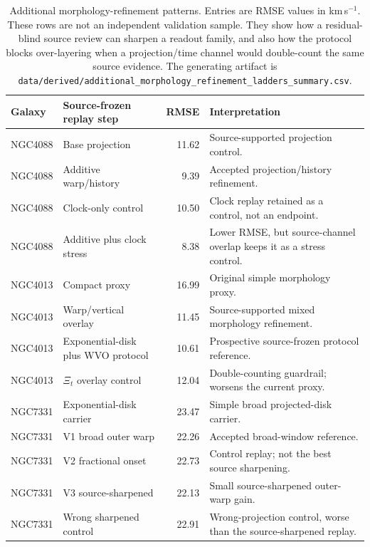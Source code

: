\documentclass[11pt]{article}
\begin{document}
\begin{table}[H]
\centering
\small
\begin{tabularx}{\linewidth}{@{}llrX@{}}
\toprule
Galaxy & Source-frozen replay step & RMSE & Interpretation \\
\midrule
NGC4088 & Base projection & 11.62 &
Source-supported projection control. \\
NGC4088 & Additive warp/history & 9.39 &
Accepted projection/history refinement. \\
NGC4088 & Clock-only control & 10.50 &
Clock replay retained as a control, not an endpoint. \\
NGC4088 & Additive plus clock stress & 8.38 &
Lower RMSE, but source-channel overlap keeps it as a stress control. \\
\midrule
NGC4013 & Compact proxy & 16.99 &
Original simple morphology proxy. \\
NGC4013 & Warp/vertical overlay & 11.45 &
Source-supported mixed morphology refinement. \\
NGC4013 & Exponential-disk plus WVO protocol & 10.61 &
Prospective source-frozen protocol reference. \\
NGC4013 & \(\Xi_t\) overlay control & 12.04 &
Double-counting guardrail; worsens the current proxy. \\
\midrule
NGC7331 & Exponential-disk carrier & 23.47 &
Simple broad projected-disk carrier. \\
NGC7331 & V1 broad outer warp & 22.26 &
Accepted broad-window reference. \\
NGC7331 & V2 fractional onset & 22.73 &
Control replay; not the best source sharpening. \\
NGC7331 & V3 source-sharpened & 22.13 &
Small source-sharpened outer-warp gain. \\
NGC7331 & Wrong sharpened control & 22.91 &
Wrong-projection control, worse than the source-sharpened replay. \\
\bottomrule
\end{tabularx}
\caption{Additional morphology-refinement patterns.  Entries are RMSE values
in km\,s\(^{-1}\).  These rows are not an independent validation sample.
They show how a residual-blind source review can sharpen a readout family,
and also how the protocol blocks over-layering when a projection/time channel
would double-count the same source evidence.  The generating artifact is
\texttt{data/derived/additional\_morphology\_refinement\_ladders\_summary.csv}.}
\label{tab:additional-morphology-refinement-patterns}
\end{table}
\end{document}

